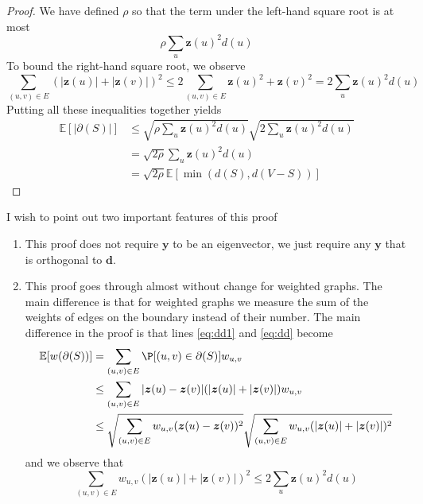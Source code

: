 \documentclass{article}
\newcommand{\bsl}[1]{\boldsymbol{#1}}
\begin{document}
\begin{proof}
We have defined $\rho$ so that the term under the left-hand square root is at most
$$
\rho \sum_{u} \boldsymbol{z}(u)^{2} d(u)
$$
To bound the right-hand square root, we observe
$$
\sum_{(u, v) \in E}(|\boldsymbol{z}(u)|+|\boldsymbol{z}(v)|)^{2} \leq 2 \sum_{(u, v) \in E} \boldsymbol{z}(u)^{2}+\boldsymbol{z}(v)^{2}=2 \sum_{u} \boldsymbol{z}(u)^{2} d(u)
$$
Putting all these inequalities together yields
$$
\begin{aligned}
\mathbb{E}[|\partial(S)|] & \leq \sqrt{\rho \sum_{u} \boldsymbol{z}(u)^{2} d(u)} \sqrt{2 \sum_{u} \boldsymbol{z}(u)^{2} d(u)} \\
&=\sqrt{2 \rho} \sum_{u} \boldsymbol{z}(u)^{2} d(u) \\
&=\sqrt{2 \rho} \mathbb{E}[\min (d(S), d(V-S))]
\end{aligned}
$$
\end{proof}
\begin{rema}
I wish to point out two important features of this proof
\begin{enumerate}
    \item This proof does not require $\bsl{y}$ to be an eigenvector, we just require any $\bsl{y}$ that is orthogonal to $\boldsymbol{d}$.
    \item This proof goes through almost without change for weighted graphs. The main difference is that for weighted graphs we measure the sum of the weights of edges on the boundary instead of their number. The main difference in the proof is that lines \cref{eq:dd1} and \cref{eq:dd} become
$$
\begin{aligned}
\mathbb{E}[w(\partial(S))] &=\sum_{(u, v) \in E} \P[(u, v) \in \partial(S)] w_{u, v} \\
& \leq \sum_{(u, v) \in E}|\boldsymbol{z}(u)-\boldsymbol{z}(v)|(|\boldsymbol{z}(u)|+|\boldsymbol{z}(v)|) w_{u, v} \\
& \leq \sqrt{\sum_{(u, v) \in E} w_{u, v}(\boldsymbol{z}(u)-\boldsymbol{z}(v))^{2}} \sqrt{\sum_{(u, v) \in E} w_{u, v}(|\boldsymbol{z}(u)|+|\boldsymbol{z}(v)|)^{2}}
\end{aligned}
$$
and we observe that
$$
\sum_{(u, v) \in E} w_{u, v}(|\boldsymbol{z}(u)|+|\boldsymbol{z}(v)|)^{2} \leq 2 \sum_{u} \boldsymbol{z}(u)^{2} d(u)
$$
\end{enumerate}
\end{rema}






\end{document}
